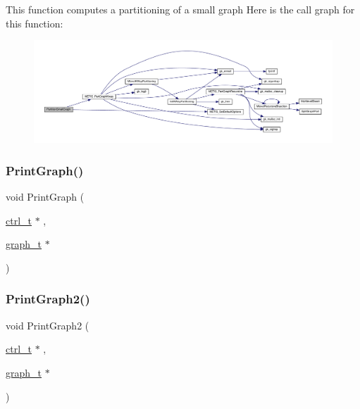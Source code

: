This function computes a partitioning of a small graph Here is the call graph for this function\+:\nopagebreak
\begin{figure}[H]
\begin{center}
\leavevmode
\includegraphics[width=350pt]{a00951_a2d6d8a17368be648ff848288a9d2d514_cgraph}
\end{center}
\end{figure}
\mbox{\label{a00951_a419ae423c8de2bdd122191b28f8ae323}} 
\subsubsection{\texorpdfstring{Print\+Graph()}{PrintGraph()}}
{\footnotesize\ttfamily void Print\+Graph (\begin{DoxyParamCaption}\item[{\hyperlink{a00742}{ctrl\+\_\+t} $\ast$}]{,  }\item[{\hyperlink{a00734}{graph\+\_\+t} $\ast$}]{ }\end{DoxyParamCaption})}

\mbox{\label{a00951_ac13a274932149498c5bfb5c3f2d4ee81}} 
\subsubsection{\texorpdfstring{Print\+Graph2()}{PrintGraph2()}}
{\footnotesize\ttfamily void Print\+Graph2 (\begin{DoxyParamCaption}\item[{\hyperlink{a00742}{ctrl\+\_\+t} $\ast$}]{,  }\item[{\hyperlink{a00734}{graph\+\_\+t} $\ast$}]{ }\end{DoxyParamCaption})}

